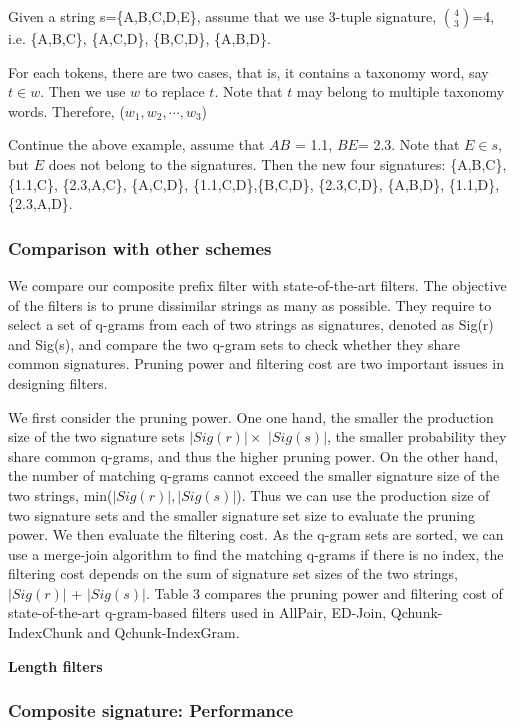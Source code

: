 Given a string s=\{A,B,C,D,E\}, assume that we use 3-tuple signature, $\binom{4}{3}$=4, i.e. \{A,B,C\}, \{A,C,D\}, \{B,C,D\}, \{A,B,D\}.

For each tokens, there are two cases, that is, it contains a taxonomy word, say $t \in w$. Then we use $w$ to replace $t$. Note that $t$ may belong to multiple taxonomy words. Therefore, ($w_1, w_2, \cdots, w_3$)

Continue the above example, assume that $AB$ = 1.1, $BE$= 2.3. Note that $E \in s $, but $E$ does not belong to the signatures. Then the new four signatures: \{A,B,C\}, \{1.1,C\}, \{2.3,A,C\}, \{A,C,D\}, \{1.1,C,D\},\{B,C,D\},  \{2.3,C,D\}, \{A,B,D\}, \{1.1,D\}, \{2.3,A,D\}.

\subsubsection{Comparison with other schemes}

 We compare our composite prefix filter with state-of-the-art filters. The objective of the filters is to prune dissimilar strings as many as possible. They require to select a set of q-grams from each of two strings as signatures, denoted as Sig(r) and Sig(s), and compare the two q-gram sets to check whether they share common signatures. Pruning power and filtering cost are two important issues in designing filters.

We first consider the pruning power. One one hand, the smaller the production size of the two signature sets $|Sig(r)| \times$
$|Sig(s)|$, the smaller probability they share common q-grams, and thus the higher pruning power. On the other hand, the number of matching q-grams cannot exceed the smaller signature size of the two strings, min($|Sig(r)|, |Sig(s)|$). Thus
we can use the production size of two signature sets and
the smaller signature set size to evaluate the pruning power. We then evaluate the filtering cost. As the q-gram sets
are sorted, we can use a merge-join algorithm to find the
matching q-grams if there is no index, the filtering cost depends on the sum of signature set sizes of the two strings,
$|Sig(r)|$ + $|Sig(s)|$. Table 3 compares the pruning power and filtering cost of state-of-the-art q-gram-based filters used in AllPair, ED-Join, Qchunk-IndexChunk and Qchunk-IndexGram.

\smallskip

\noindent \textbf{Length filters}


\subsubsection{Composite signature: Performance}

